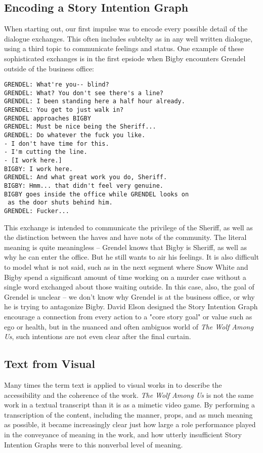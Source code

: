 \subsection{Encoding a Story Intention Graph}
\label{sec:orgheadline6}
When starting out, our first impulse was to encode every possible
detail of the dialogue exchanges. This often includes subtelty as in
any well written dialogue, using a third topic to communicate feelings
and status. One example of these sophisticated exchanges is in the
first epsiode when Bigby encounters Grendel outside of the business
office:

\begin{verbatim}
GRENDEL: What're you-- blind?
GRENDEL: What? You don't see there's a line? 
GRENDEL: I been standing here a half hour already. 
GRENDEL: You get to just walk in?
GRENDEL approaches BIGBY
GRENDEL: Must be nice being the Sheriff... 
GRENDEL: Do whatever the fuck you like.
- I don't have time for this.
- I'm cutting the line.
- [I work here.]
BIGBY: I work here.
GRENDEL: And what great work you do, Sheriff.
BIGBY: Hmm... that didn't feel very genuine.
BIGBY goes inside the office while GRENDEL looks on
 as the door shuts behind him.
GRENDEL: Fucker...
\end{verbatim}

This exchange is intended to communicate the privilege of the Sheriff,
as well as the distinction between the haves and have nots of the
community. The literal meaning is quite meaningless -- Grendel knows
that Bigby is Sheriff, as well as why he can enter the office. But he
still wants to air his feelings. It is also difficult to model what is
not said, such as in the next segment where Snow White and Bigby spend
a significant amount of time working on a murder case without a single
word exchanged about those waiting outside. In this case, also, the
goal of Grendel is unclear -- we don't know why Grendel is at the
business office, or why he is trying to antagonize Bigby. David Elson
designed the Story Intention Graph encourage a connection from every
action to a "core story goal" or value such as ego or health, but in
the nuanced and often ambiguos world of \emph{The Wolf Among Us}, such
intentions are not even clear after the final curtain.

\subsection{Text from Visual}
\label{sec:orgheadline7}
Many times the term text is applied to visual works in to describe the
accessibility and the coherence of the work. \emph{The Wolf Among Us} is
not the same work in a textual transcript than it is as a mimetic
video game. By performing a transcription of the content, including
the manner, props, and as much meaning as possible, it became
increasingly clear just how large a role performance played in the
conveyance of meaning in the work, and how utterly insufficient Story
Intention Graphs were to this nonverbal level of meaning.

